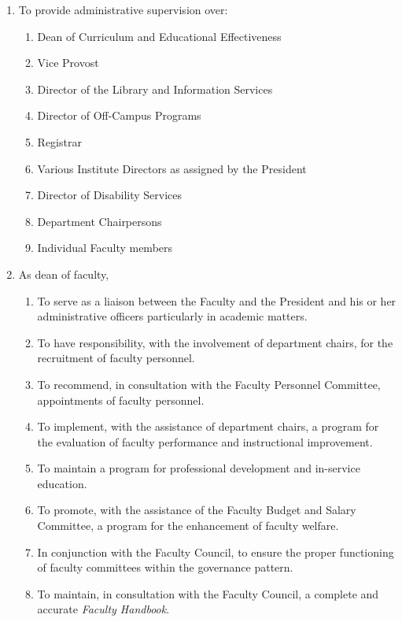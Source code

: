 \begin{enumerate}
{\begin{enumerate}
{\begin{enumerate}
										\item{To provide administrative supervision over:
											\begin{enumerate}
												\item{Dean of Curriculum and Educational Effectiveness}
												\item{Vice Provost}
												\item{Director of the Library and Information Services}
												\item{Director of Off-Campus Programs}
												\item{Registrar}
												\item{Various Institute Directors as assigned by the President}
												\item{Director of Disability Services}
												\item{Department Chairpersons}
												\item{Individual Faculty members}
											\end{enumerate}
										}
										\item{As dean of faculty,
											\begin{enumerate}
												\item{To serve as a liaison between the Faculty and the President and his or her administrative officers particularly in academic matters.}
												\item{To have responsibility, with the involvement of department chairs, for the recruitment of faculty personnel.}
												\item{To recommend, in consultation with the Faculty Personnel Committee, appointments of faculty personnel.}
												\item{To implement, with the assistance of department chairs, a program for the evaluation of faculty performance and instructional improvement.}
												\item{To maintain a program for professional development and in-service education.}
												\item{To promote, with the assistance of the Faculty Budget and Salary Committee, a program for the enhancement of faculty welfare.}
												\item{In conjunction with the Faculty Council, to ensure the proper functioning of faculty committees within the governance pattern.}
												\item{To maintain, in consultation with the Faculty Council, a complete and accurate \emph{Faculty Handbook}.}

\end{enumerate}}
\end{enumerate}}
\end{enumerate}}
\end{enumerate}
